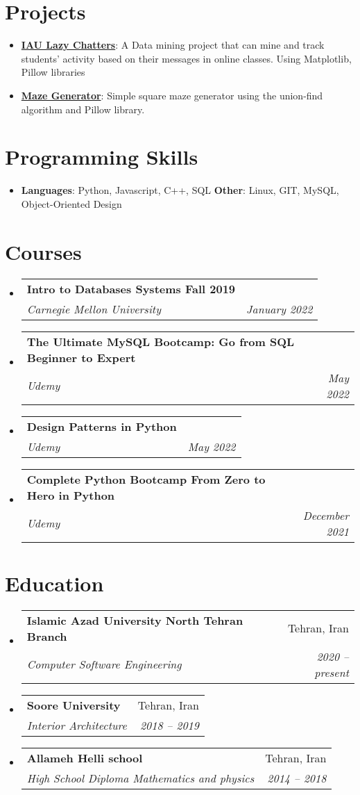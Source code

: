 \documentclass[letterpaper,11pt]{article}
\makeatletter
\newcommand{\resumeItem}[2]{
  \item\small{
    \textbf{#1}{: #2 \vspace{-2pt}}
  }
}
\newcommand{\resumeSubheading}[4]{
  \vspace{-1pt}\item
    \begin{tabular*}{0.97\textwidth}{l@{\extracolsep{\fill}}r}
      \textbf{#1} & #2 \\
      \textit{\small#3} & \textit{\small #4} \\
    \end{tabular*}\vspace{-5pt}
}
\newcommand{\resumeSubItem}[2]{\resumeItem{#1}{#2}\vspace{-4pt}}
\newcommand{\resumeSubHeadingListStart}{\begin{itemize}[leftmargin=*]}
\newcommand{\resumeSubHeadingListEnd}{\end{itemize}}
\makeatother
\begin{document}


\section{Projects}
  \resumeSubHeadingListStart
    \resumeSubItem {\href{https://github.com/daway0/lazychatter}{IAU Lazy Chatters}}
    {A Data mining project that can mine and track students' activity based on their messages in online classes. Using Matplotlib, Pillow libraries}
     \resumeSubItem{\href{https://github.com/daway0/simple_maze_generator}{Maze Generator}}
      {Simple square maze generator using the union-find algorithm and Pillow library.
}

  \resumeSubHeadingListEnd

\section{Programming Skills}
 \resumeSubHeadingListStart
   \item{
     \textbf{Languages}{: Python, Javascript, C++, SQL }
     \textbf{Other}{: Linux, GIT, MySQL, Object-Oriented Design }
   }
 \resumeSubHeadingListEnd

\section{Courses}
  \resumeSubHeadingListStart
    \resumeSubheading
      {Intro to Databases Systems Fall 2019}{}
      {Carnegie Mellon University}{January 2022}
    \resumeSubheading
      {The Ultimate MySQL Bootcamp: Go from SQL Beginner to Expert}{}
      {Udemy}{May 2022}
    \resumeSubheading
      {Design Patterns in Python}{}
      {Udemy}{May 2022}
    \resumeSubheading
      {Complete Python Bootcamp From Zero to Hero in Python}{}
      {Udemy}{December 2021}
  \resumeSubHeadingListEnd


\section{Education}
  \resumeSubHeadingListStart
    \resumeSubheading
      {Islamic Azad University North Tehran Branch}{Tehran, Iran}
      {Computer Software Engineering}{2020 -- present}
    \resumeSubheading
      {Soore University}{Tehran, Iran}
      {Interior Architecture}{2018 -- 2019}
    \resumeSubheading
      {Allameh Helli school}{Tehran, Iran}
      {High School Diploma Mathematics and physics}{2014 -- 2018}
  \resumeSubHeadingListEnd

%


\end{document}
